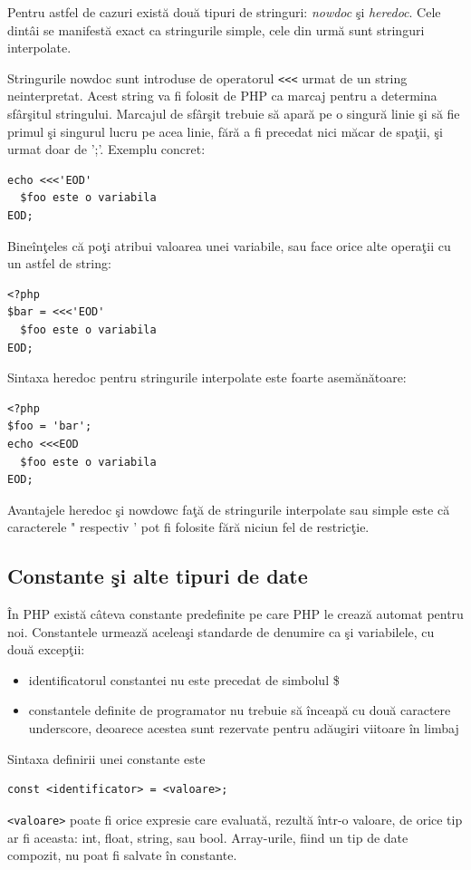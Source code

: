 Pentru astfel de cazuri există două tipuri de stringuri: \textsl{nowdoc} şi \textsl{heredoc}.
Cele dintâi se manifestă exact ca stringurile simple, cele din urmă
sunt stringuri interpolate.

Stringurile nowdoc sunt introduse de operatorul  \verb '<<<' urmat de un string neinterpretat.
Acest string va fi folosit de PHP ca marcaj pentru a determina sfârşitul stringului. Marcajul de sfârşit trebuie
să apară pe o singură linie şi să fie primul şi singurul lucru pe acea linie, fără a fi precedat nici măcar
de spaţii, şi urmat doar de ';'. Exemplu concret:

\begin{lstlisting}
echo <<<'EOD'
  $foo este o variabila 
EOD;
\end{lstlisting}

Bineînţeles că poţi atribui valoarea unei variabile, sau face orice
alte operaţii cu un astfel de string:
\begin{lstlisting}
<?php
$bar = <<<'EOD'
  $foo este o variabila
EOD;
\end{lstlisting}

Sintaxa heredoc pentru stringurile interpolate este foarte asemănătoare:
\begin{lstlisting}
<?php
$foo = 'bar';
echo <<<EOD
  $foo este o variabila 
EOD;
\end{lstlisting}

Avantajele heredoc şi nowdowc faţă de stringurile interpolate sau simple este că
caracterele " respectiv ' pot fi folosite fără niciun fel de restricţie.

\subsection{Constante şi alte tipuri de date}
În PHP există câteva constante predefinite pe care PHP le
crează automat pentru noi. Constantele urmează aceleaşi
standarde de denumire ca şi variabilele, cu două excepţii:
\begin{itemize}
	\item identificatorul constantei nu este precedat de simbolul \$
	\item constantele definite de programator nu trebuie să înceapă cu două caractere
underscore, deoarece acestea sunt rezervate pentru adăugiri viitoare în limbaj
\end{itemize}
Sintaxa definirii unei constante este
\begin{verbatim}
const <identificator> = <valoare>;
\end{verbatim}
\texttt{<valoare>} poate fi orice expresie care evaluată, rezultă într-o valoare,
de orice tip ar fi aceasta: int, float, string, sau bool. Array-urile, fiind un tip
de date compozit, nu poat fi salvate în constante.

